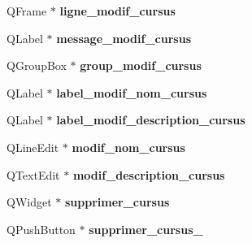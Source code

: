 \begin{DoxyCompactItemize}
\item 
\hypertarget{class_ui___administration_ac4b6ab9ebbcf295cba760e87f55baa41}{Q\+Frame $\ast$ {\bfseries ligne\+\_\+modif\+\_\+cursus}}\label{class_ui___administration_ac4b6ab9ebbcf295cba760e87f55baa41}

\item 
\hypertarget{class_ui___administration_adc1bad010c8b17e723287ddd36c96fad}{Q\+Label $\ast$ {\bfseries message\+\_\+modif\+\_\+cursus}}\label{class_ui___administration_adc1bad010c8b17e723287ddd36c96fad}

\item 
\hypertarget{class_ui___administration_a83ed4f141fb1bb311df835acbc76ce42}{Q\+Group\+Box $\ast$ {\bfseries group\+\_\+modif\+\_\+cursus}}\label{class_ui___administration_a83ed4f141fb1bb311df835acbc76ce42}

\item 
\hypertarget{class_ui___administration_a1467efb977267ecc97b23763267b6141}{Q\+Label $\ast$ {\bfseries label\+\_\+modif\+\_\+nom\+\_\+cursus}}\label{class_ui___administration_a1467efb977267ecc97b23763267b6141}

\item 
\hypertarget{class_ui___administration_a2ddc5d9dd00553b0ce2bea3889830c2c}{Q\+Label $\ast$ {\bfseries label\+\_\+modif\+\_\+description\+\_\+cursus}}\label{class_ui___administration_a2ddc5d9dd00553b0ce2bea3889830c2c}

\item 
\hypertarget{class_ui___administration_a46b2b2ca016086e16ab16179833a5f34}{Q\+Line\+Edit $\ast$ {\bfseries modif\+\_\+nom\+\_\+cursus}}\label{class_ui___administration_a46b2b2ca016086e16ab16179833a5f34}

\item 
\hypertarget{class_ui___administration_a75987b7ec8321902c981b3f2d3b1859c}{Q\+Text\+Edit $\ast$ {\bfseries modif\+\_\+description\+\_\+cursus}}\label{class_ui___administration_a75987b7ec8321902c981b3f2d3b1859c}

\item 
\hypertarget{class_ui___administration_a19b18687ee42b1b2d39197637f519563}{Q\+Widget $\ast$ {\bfseries supprimer\+\_\+cursus}}\label{class_ui___administration_a19b18687ee42b1b2d39197637f519563}

\item 
\hypertarget{class_ui___administration_aca3cfeb7d0a7a8e6613555a4a0b632af}{Q\+Push\+Button $\ast$ {\bfseries supprimer\+\_\+cursus\+\_}}\label{class_ui___administration_aca3cfeb7d0a7a8e6613555a4a0b632af}


\end{DoxyCompactItemize}
